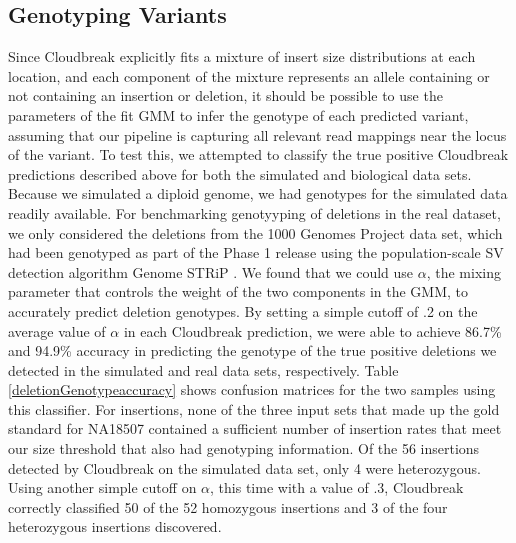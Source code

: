 \documentclass[11pt]{article}
\begin{document}
\subsection{Genotyping Variants}

Since Cloudbreak explicitly fits a mixture of insert size distributions at each location, and each component of the mixture represents an allele containing or not containing an insertion or deletion, it should be possible to use the parameters of the fit GMM to infer the genotype of each predicted variant, assuming that our pipeline is capturing all relevant read mappings near the locus of the variant. To test this, we attempted to classify the true positive Cloudbreak predictions described above for both the simulated and biological data sets. Because we simulated a diploid genome, we had genotypes for the simulated data readily available. For benchmarking genotyyping of deletions in the real dataset, we only considered the deletions from the 1000 Genomes Project data set, which had been genotyped as part of the Phase 1 release using the population-scale SV detection algorithm Genome STRiP \autocite{Handsaker:2011ki}. We found that we could use $\alpha$, the mixing parameter that controls the weight of the two components in the GMM, to accurately predict deletion genotypes. By setting a simple cutoff of .2 on the average value of $\alpha$ in each Cloudbreak prediction, we were able to achieve 86.7\% and 94.9\% accuracy in predicting the genotype of the true positive deletions we detected in the simulated and real data sets, respectively. Table \ref{deletionGenotypeaccuracy} shows confusion matrices for the two samples using this classifier. For insertions, none of the three input sets that made up the gold standard for NA18507 contained a sufficient number of insertion rates that meet our size threshold that also had genotyping information. Of the 56 insertions detected by Cloudbreak on the simulated data set, only 4 were heterozygous. Using another simple cutoff on $\alpha$, this time with a value of .3, Cloudbreak correctly classified 50 of the 52 homozygous insertions and 3 of the four heterozygous insertions discovered.
\end{document}
